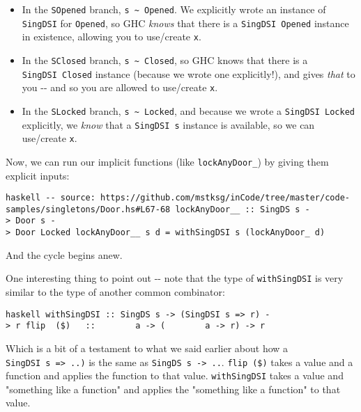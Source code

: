 \documentclass[]{article}
\begin{document}
\begin{itemize}
\tightlist
\item
  In the \texttt{SOpened} branch,
  \texttt{s\ \textasciitilde{}\ \textquotesingle{}Opened}. We explicitly wrote
  an instance of \texttt{SingDSI} for \texttt{\textquotesingle{}Opened}, so GHC
  \emph{knows} that there is a \texttt{SingDSI\ \textquotesingle{}Opened}
  instance in existence, allowing you to use/create \texttt{x}.
\item
  In the \texttt{SClosed} branch,
  \texttt{s\ \textasciitilde{}\ \textquotesingle{}Closed}, so GHC knows that
  there is a \texttt{SingDSI\ \textquotesingle{}Closed} instance (because we
  wrote one explicitly!), and gives \emph{that} to you -\/- and so you are
  allowed to use/create \texttt{x}.
\item
  In the \texttt{SLocked} branch,
  \texttt{s\ \textasciitilde{}\ \textquotesingle{}Locked}, and because we wrote
  a \texttt{SingDSI\ \textquotesingle{}Locked} explicitly, we \emph{know} that a
  \texttt{SingDSI\ s} instance is available, so we can use/create \texttt{x}.
\end{itemize}

Now, we can run our implicit functions (like \texttt{lockAnyDoor\_}) by giving
them explicit inputs:

\texttt{haskell\ -\/-\ source:\ https://github.com/mstksg/inCode/tree/master/code-samples/singletons/Door.hs\#L67-68\ lockAnyDoor\_\_\ ::\ SingDS\ s\ -\textgreater{}\ Door\ s\ -\textgreater{}\ Door\ \textquotesingle{}Locked\ lockAnyDoor\_\_\ s\ d\ =\ withSingDSI\ s\ (lockAnyDoor\_\ d)}

And the cycle begins anew.

One interesting thing to point out -\/- note that the type of
\texttt{withSingDSI} is very similar to the type of another common combinator:

\texttt{haskell\ withSingDSI\ ::\ SingDS\ s\ -\textgreater{}\ (SingDSI\ s\ =\textgreater{}\ r)\ -\textgreater{}\ r\ flip\ \ (\$)\ \ \ ::\ \ \ \ \ \ \ \ a\ -\textgreater{}\ (\ \ \ \ \ \ \ \ a\ -\textgreater{}\ r)\ -\textgreater{}\ r}

Which is a bit of a testament to what we said earlier about how a
\texttt{SingDSI\ s\ =\textgreater{}\ ..)} is the same as
\texttt{SingDS\ s\ -\textgreater{}\ ..}. \texttt{flip\ (\$)} takes a value and a
function and applies the function to that value. \texttt{withSingDSI} takes a
value and "something like a function" and applies the "something like a
function" to that value.
\end{document}
